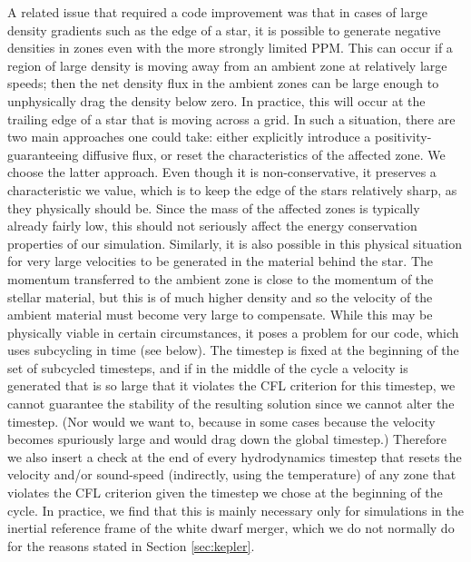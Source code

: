 \documentclass[12pt,preprint]{aastex}
\begin{document}
A related issue that required a code improvement was that in cases of large density gradients such as the edge of a star, it is possible to generate negative densities in zones even with the more strongly limited PPM. This can occur if a region of large density is moving away from an ambient zone at relatively large speeds; then the net density flux in the ambient zones can be large enough to unphysically drag the density below zero. In practice, this will occur at the trailing edge of a star that is moving across a grid. In such a situation, there are two main approaches one could take: either explicitly introduce a positivity-guaranteeing diffusive flux, or reset the characteristics of the affected zone. We choose the latter approach. Even though it is non-conservative, it preserves a characteristic we value, which is to keep the edge of the stars relatively sharp, as they physically should be. Since the mass of the affected zones is typically already fairly low, this should not seriously affect the energy conservation properties of our simulation. Similarly, it is also possible in this physical situation for very large velocities to be generated in the material behind the star. The momentum transferred to the ambient zone is close to the momentum of the stellar material, but this is of much higher density and so the velocity of the ambient material must become very large to compensate. While this may be physically viable in certain circumstances, it poses a problem for our code, which uses subcycling in time (see below). The timestep is fixed at the beginning of the set of subcycled timesteps, and if in the middle of the cycle a velocity is generated that is so large that it violates the CFL criterion for this timestep, we cannot guarantee the stability of the resulting solution since we cannot alter the timestep. (Nor would we want to, because in some cases because the velocity becomes spuriously large and would drag down the global timestep.) Therefore we also insert a check at the end of every hydrodynamics timestep that resets the velocity and/or sound-speed (indirectly, using the temperature) of any zone that violates the CFL criterion given the timestep we chose at the beginning of the cycle. In practice, we find that this is mainly necessary only for simulations in the inertial reference frame of the white dwarf merger, which we do not normally do for the reasons stated in Section \ref{sec:kepler}.
\end{document}
